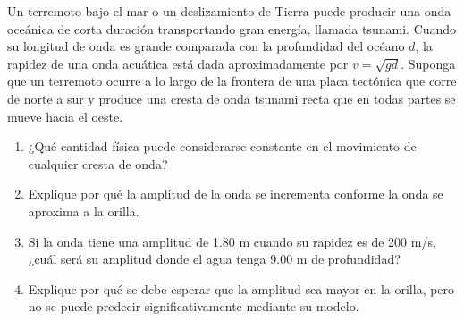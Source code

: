 \item Un terremoto bajo el mar o un deslizamiento de Tierra puede producir una onda oceánica de corta duración transportando gran energía, llamada tsunami. Cuando su longitud de onda es grande comparada con la profundidad del océano $d$, la rapidez de una onda acuática está dada aproximadamente por $v = \sqrt{gd}$. Suponga que un terremoto ocurre a lo largo de la frontera de una placa tectónica que corre de norte a sur y produce una cresta de onda tsunami recta que en todas partes se mueve hacia el oeste.
\begin{enumerate}
    \item ¿Qué cantidad física puede considerarse constante en el movimiento de cualquier cresta de onda?
    \item Explique por qué la amplitud de la onda se incrementa conforme la onda se aproxima a la orilla.
    \item Si la onda tiene una amplitud de 1.80 m cuando su rapidez es de 200 m/s, ¿cuál será su amplitud donde el agua tenga 9.00 m de profundidad?
    \item Explique por qué se debe esperar que la amplitud sea mayor en la orilla, pero no se puede predecir significativamente mediante su modelo.
\end{enumerate}